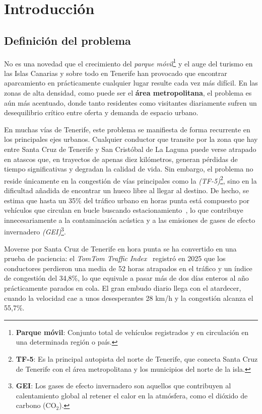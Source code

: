 \chapter{Introducción}
\label{ch:introducción}
\section{Definición del problema}

No es una novedad que el crecimiento del \textit{parque móvil}\footnote{\textbf{Parque móvil}: Conjunto total de vehículos registrados y en circulación en una determinada región o país.} y el auge del turismo en las Islas Canarias y sobre todo en Tenerife han provocado que encontrar aparcamiento en prácticamente cualquier lugar resulte cada vez más difícil. En las zonas de alta densidad, como puede ser el \textbf{área metropolitana}, el problema es aún más acentuado, donde tanto residentes como visitantes diariamente sufren un desequilibrio crítico entre oferta y demanda de espacio urbano.

En muchas vías de Tenerife, este problema se manifiesta de forma recurrente en los principales ejes urbanos. Cualquier conductor que transite por la zona que hay entre Santa Cruz de Tenerife y San Cristóbal de La Laguna puede verse atrapado en atascos que, en trayectos de apenas diez kilómetros, generan pérdidas de tiempo significativas y degradan la calidad de vida. Sin embargo, el problema no reside únicamente en la congestión de vías principales como la \textit{(TF-5)}\footnote{\textbf{TF-5}: Es la principal autopista del norte de Tenerife, que conecta Santa Cruz de Tenerife con el área metropolitana y los municipios del norte de la isla.}, sino en la dificultad añadida de encontrar un hueco libre al llegar al destino. De hecho, se estima que hasta un 35\% del tráfico urbano en horas punta está compuesto por vehículos que circulan en bucle buscando estacionamiento~\cite{elpais2025trafico35}, lo que contribuye innecesariamente a la contaminación acústica y a las emisiones de gases de efecto invernadero \textit{(GEI)}\footnote{\textbf{GEI}: Los gases de efecto invernadero son aquellos que contribuyen al calentamiento global al retener el calor en la atmósfera, como el dióxido de carbono (CO$_2$).}.

Moverse por Santa Cruz de Tenerife en hora punta se ha convertido en una prueba de paciencia: el \textit{TomTom Traffic Index}~\cite{tomtom2026} registró en 2025 que los conductores perdieron una media de 52 horas atrapados en el tráfico y un índice de congestión del 34,8\%, lo que equivale a pasar más de dos días enteros al año prácticamente parados en cola. El gran embudo diario llega con  el atardecer, cuando la velocidad cae a unos desesperantes 28 km/h y la congestión alcanza el 55,7\%.

